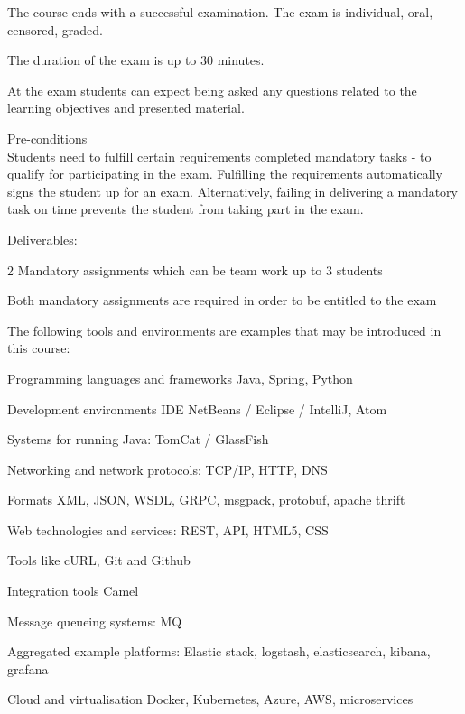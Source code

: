 \documentclass[Screen16to9,17pt]{foils}
\begin{document}

\begin{list2}
\item The course ends with a successful examination. The exam is individual, oral, censored, graded.
\item The duration of the exam is up to 30 minutes.
\item At the exam students can expect being asked any questions related to the learning objectives and presented material.
\end{list2}

Pre-conditions\\
Students need to fulfill certain requirements  completed mandatory tasks - to qualify for participating in the exam.
Fulfilling the requirements automatically signs the student up for an exam. Alternatively, failing in delivering a mandatory
task on time prevents the student from taking part in the exam.

\begin{list2}
\item Deliverables:
\item 2 Mandatory assignments which can be team work up to 3 students
\item Both mandatory assignments are required in order to be entitled to the exam
\end{list2}



The following tools and environments are examples that may be introduced in this course:

\begin{list2}
\item Programming languages and frameworks Java, Spring, Python
\item Development environments IDE NetBeans / Eclipse / IntelliJ, Atom
\item Systems for running Java: TomCat / GlassFish
\item Networking and network protocols: TCP/IP, HTTP, DNS
\item Formats XML, JSON, WSDL, GRPC, msgpack, protobuf, apache thrift
\item Web technologies and services: REST, API, HTML5, CSS
\item Tools like cURL, Git and Github
\item Integration tools Camel
\item Message queueing systems: MQ
\item Aggregated example platforms: Elastic stack, logstash, elasticsearch, kibana, grafana
\item Cloud and virtualisation Docker, Kubernetes, Azure, AWS, microservices
\end{list2}
\end{document}
